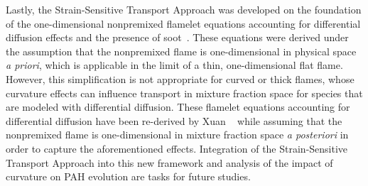 Lastly, the Strain-Sensitive Transport Approach was developed on the foundation of the one-dimensional nonpremixed flamelet equations accounting for differential diffusion effects and the presence of soot~\cite{pitsch1998,mueller2012}. These equations were derived under the assumption that the nonpremixed flame is one-dimensional in physical space \textit{a priori}, which is applicable in the limit of a thin, one-dimensional flat flame. However, this simplification is not appropriate for curved or thick flames, whose curvature effects can influence transport in mixture fraction space for species that are modeled with differential diffusion. These flamelet equations accounting for differential diffusion have been re-derived by Xuan \etal~\cite{xuan2014} while assuming that the nonpremixed flame is one-dimensional in mixture fraction space \textit{a posteriori} in order to capture the aforementioned effects. Integration of the Strain-Sensitive Transport Approach into this new framework and analysis of the impact of curvature on PAH evolution are tasks for future studies.
